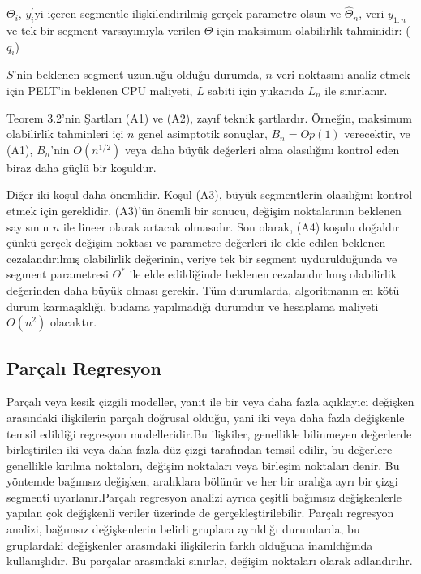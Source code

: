 \documentclass[12pt,twoside]{deuthesis}
\begin{document}
\(\Theta_i\), \(y_i^{'}\)yi içeren segmentle ilişkilendirilmiş gerçek parametre olsun ve \(\hat{\Theta}_n\), veri \(y_{1:n}\) ve tek bir segment varsayımıyla verilen \(\Theta\) için maksimum olabilirlik tahminidir: (\(q_i\))

\(S\)'nin beklenen segment uzunluğu olduğu durumda, \(n\) veri noktasını analiz etmek için PELT'in beklenen CPU maliyeti, \(L\) sabiti için yukarıda \(L_n\) ile sınırlanır.

Teorem 3.2'nin Şartları (A1) ve (A2), zayıf teknik şartlardır. Örneğin, maksimum olabilirlik tahminleri içi \(n\) genel asimptotik sonuçlar, \(B_n = Op(1)\) verecektir, ve (A1), \(B_n\)'nin \(O(n^{1/2})\) veya daha büyük değerleri alma olasılığını kontrol eden biraz daha güçlü bir koşuldur.

Diğer iki koşul daha önemlidir. Koşul (A3), büyük segmentlerin olasılığını kontrol etmek için gereklidir. (A3)'ün önemli bir sonucu, değişim noktalarının beklenen sayısının \(n\) ile lineer olarak artacak olmasıdır. Son olarak, (A4) koşulu doğaldır çünkü gerçek değişim noktası ve parametre değerleri ile elde edilen beklenen cezalandırılmış olabilirlik değerinin, veriye tek bir segment uydurulduğunda ve segment parametresi \(\Theta^*\) ile elde edildiğinde beklenen cezalandırılmış olabilirlik değerinden daha büyük olması gerekir. Tüm durumlarda, algoritmanın en kötü durum karmaşıklığı, budama yapılmadığı durumdur ve hesaplama maliyeti \(O(n^2)\) olacaktır.

\subsection{Parçalı Regresyon}\label{paruxe7alux131-regresyon}

Parçalı veya kesik çizgili modeller, yanıt ile bir veya daha fazla açıklayıcı değişken arasındaki ilişkilerin parçalı doğrusal olduğu, yani iki veya daha fazla değişkenle temsil edildiği regresyon modelleridir.Bu ilişkiler, genellikle bilinmeyen değerlerde birleştirilen iki veya daha fazla düz çizgi tarafından temsil edilir, bu değerlere genellikle kırılma noktaları, değişim noktaları veya birleşim noktaları denir. Bu yöntemde bağımsız değişken, aralıklara bölünür ve her bir aralığa ayrı bir çizgi segmenti uyarlanır.Parçalı regresyon analizi ayrıca çeşitli bağımsız değişkenlerle yapılan çok değişkenli veriler üzerinde de gerçekleştirilebilir. Parçalı regresyon analizi, bağımsız değişkenlerin belirli gruplara ayrıldığı durumlarda, bu gruplardaki değişkenler arasındaki ilişkilerin farklı olduğuna inanıldığında kullanışlıdır. Bu parçalar arasındaki sınırlar, değişim noktaları olarak adlandırılır.
\end{document}
